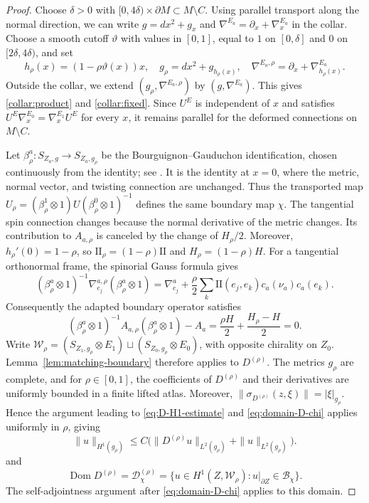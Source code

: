 \documentclass[12pt,reqno]{amsart}
\numberwithin{equation}{section}
\theoremstyle{definition}
\newcommand{\cW}{\mathscr W}
\begin{document}
\begin{proof}
Choose $\delta>0$ with $[0,4\delta)\times\partial M\subset M\setminus C$.
Using parallel transport along the normal direction, we can write $g=dx^2+g_x$ and
$\nabla^{E_a}=\partial_x+\nabla_x^{E_a}$ in the collar.  
Choose a smooth cutoff $\vartheta$ with values in $[0,1]$, equal to $1$ on
$[0,\delta]$ and $0$ on $[2\delta,4\delta)$, and set
\begin{equation}\label{eq:collar-deformation}
 h_\rho(x)=(1-\rho\vartheta(x))x,\quad
 g_\rho=dx^2+g_{h_\rho(x)},\quad
 \nabla^{E_a,\rho}=\partial_x+\nabla^{E_a}_{h_\rho(x)}.
\end{equation}
Outside the collar, we extend $(g_\rho, \nabla^{E_a,\rho})$ by $(g, \nabla^{E_a})$.  This gives
\ref{collar:product} and \ref{collar:fixed}.  Since $U^E$ is independent of $x$ and satisfies
$U^E\nabla_x^{E_0}=\nabla_x^{E_1}U^E$ for every $x$, it remains parallel for the deformed connections on
$M\setminus C$.

Let $\beta_\rho^a:S_{Z_a,g}\to S_{Z_a,g_\rho}$ be the
Bourguignon--Gauduchon identification, chosen continuously from the
identity; see \cite[\S I, Propositions~1 and 5, and \S II]{BourguignonGauduchon}.
It is the identity at $x=0$, where the metric, normal vector, and
twisting connection are unchanged.  Thus the transported map
$U_\rho=(\beta_\rho^1\otimes1)U(\beta_\rho^0\otimes1)^{-1}$
defines the same boundary map $\chi$. The tangential spin connection changes because the normal derivative
of the metric changes.  Its contribution to $A_{a,\rho}$ is canceled
by the change of $H_\rho/2$.
Moreover, $h_\rho'(0)=1-\rho$, so
$\mathrm{II}_\rho=(1-\rho)\mathrm{II}$ and $H_\rho=(1-\rho)H$.
For a tangential orthonormal frame, the spinorial Gauss formula gives
\[
 (\beta_\rho^a\otimes1)^{-1}\nabla^{a,\rho}_{e_j}
       (\beta_\rho^a\otimes1)
 =\nabla^a_{e_j}+\frac\rho2\sum_k
       \mathrm{II}(e_j,e_k)c_a(\nu_a)c_a(e_k).
\]
Consequently the adapted boundary operator satisfies
\[
 (\beta_\rho^a\otimes1)^{-1}A_{a,\rho}(\beta_\rho^a\otimes1)-A_a
 =\frac{\rho H}{2}+\frac{H_\rho-H}{2}=0.
\]
Write $\cW_\rho=(S_{Z_1,g_\rho}\otimes E_1)\sqcup
(S_{Z_0,g_\rho}\otimes E_0)$, with opposite chirality on $Z_0$.
Lemma~\ref{lem:matching-boundary} therefore applies to $D^{(\rho)}$.
The metrics $g_\rho$ are complete, and for $\rho\in[0,1]$, the
coefficients of $D^{(\rho)}$ and their derivatives are uniformly
bounded in a finite lifted atlas. Moreover, $\|\sigma_{D^{(\rho)}}(z,\xi)\|=|\xi|_{g_\rho}$.
Hence the argument leading to \eqref{eq:D-H1-estimate} and
\eqref{eq:domain-D-chi} applies uniformly in $\rho$, giving
\begin{equation}\label{eq:rho-H1-estimate}
 \|u\|_{H^1(g_\rho)}
 \leq C\bigl(\|D^{(\rho)}u\|_{L^2(g_\rho)}
             +\|u\|_{L^2(g_\rho)}\bigr).
\end{equation}
and
\[
 \operatorname{Dom}D^{(\rho)}
 =\mathcal D_\chi^{(\rho)}
 =\{u\in H^1(Z,\cW_\rho):
      u|_{\partial Z}\in\mathcal B_\chi\}.
\]
The self-adjointness argument after \eqref{eq:domain-D-chi}
applies to this domain.


\end{proof}
\end{document}
